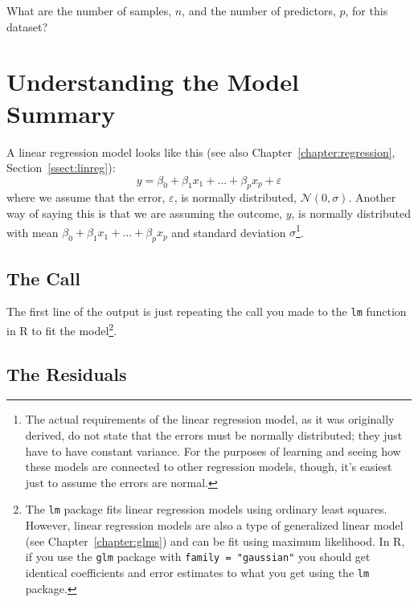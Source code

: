 \begin{question}{}
What are the number of samples, $n$, and the number of predictors, $p$, for this dataset?
\end{question}


\section{Understanding the Model Summary}

A linear regression model looks like this (see also Chapter~\ref{chapter:regression}, Section~\ref{ssect:linreg}):
$$ y = \beta_0 + \beta_1 x_1 + \dots + \beta_p x_p + \varepsilon $$
where we assume that the error, $\varepsilon$, is normally distributed, $\mathcal{N}(0, \sigma)$. Another way of saying this is that we are assuming the outcome, $y$, is normally distributed with mean $\beta_0 + \beta_1 x_1 + \dots + \beta_p x_p$ and standard deviation $\sigma$\footnote{The actual requirements of the linear regression model, as it was originally derived, do not state that the errors must be normally distributed; they just have to have constant variance. For the purposes of learning and seeing how these models are connected to other regression models, though, it's easiest just to assume the errors are normal.}. 

\subsection{The Call}

The first line of the output is just repeating the call you made to the \verb|lm| function in R to fit the model\footnote{The \texttt{lm} package fits linear regression models using ordinary least squares. However, linear regression models are also a type of generalized linear model (see Chapter~\ref{chapter:glms}) and can be fit using maximum likelihood. In R, if you use the \texttt{glm} package with \texttt{family = "gaussian"} you should get identical coefficients and error estimates to what you get using the \texttt{lm} package.}.

\subsection{The Residuals}

